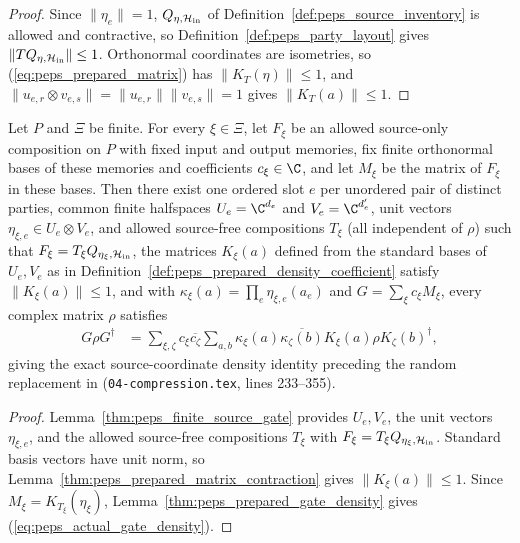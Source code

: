 \begin{proof}\leanok
    Since $\|\eta_e\|=1$, $Q_{\eta,\mathcal H_{\rm in}}$ of
    Definition~\ref{def:peps_source_inventory} is allowed and contractive, so
    Definition~\ref{def:peps_party_layout} gives
    $\|TQ_{\eta,\mathcal H_{\rm in}}\|\le1$. Orthonormal coordinates are
    isometries, so (\ref{eq:peps_prepared_matrix}) has $\|K_T(\eta)\|\le1$,
    and $\|u_{e,r}\otimes v_{e,s}\|=\|u_{e,r}\|\|v_{e,s}\|=1$ gives
    $\|K_T(a)\|\le1$.
\end{proof}

\begin{lemma}
    \label{thm:peps_actual_gate_density}
    \leanok
    Let $P$ and $\Xi$ be finite. For every $\xi\in\Xi$, let $F_\xi$ be an
    allowed source-only composition on $P$ with fixed input and output
    memories, fix finite orthonormal bases of these memories and coefficients
    $c_\xi\in\C$, and let $M_\xi$ be the matrix of $F_\xi$ in these bases.
    Then there exist one ordered slot $e$ per unordered pair of distinct
    parties, common finite halfspaces $U_e=\C^{d_e}$ and $V_e=\C^{d'_e}$, unit
    vectors $\eta_{\xi,e}\in U_e\otimes V_e$, and allowed source-free
    compositions $T_\xi$ (all independent of $\rho$) such that
    $F_\xi=T_\xi Q_{\eta_\xi,\mathcal H_{\rm in}}$, the matrices $K_\xi(a)$
    defined from the standard bases of $U_e,V_e$ as in
    Definition~\ref{def:peps_prepared_density_coefficient} satisfy
    $\|K_\xi(a)\|\le1$, and with $\kappa_\xi(a)=\prod_e\eta_{\xi,e}(a_e)$ and
    $G=\sum_\xi c_\xi M_\xi$, every complex matrix $\rho$ satisfies
    \begin{align}
        G\rho G^\dagger
         & =\sum_{\xi,\zeta}c_\xi\overline{c_\zeta}
        \sum_{a,b}\kappa_\xi(a)\overline{\kappa_\zeta(b)}
        K_\xi(a)\rho K_\zeta(b)^\dagger,
        \label{eq:peps_actual_gate_density}
    \end{align}
    giving the exact source-coordinate density identity preceding the random
    replacement in \cite[proof of Theorem~5.2]{OpenAI2026PolynomialPEPS}
    (\texttt{04-compression.tex}, lines 233--355).
\end{lemma}

\begin{proof}\leanok
    Lemma~\ref{thm:peps_finite_source_gate} provides $U_e,V_e$, the unit
    vectors $\eta_{\xi,e}$, and the allowed source-free compositions $T_\xi$
    with $F_\xi=T_\xi Q_{\eta_\xi,\mathcal H_{\rm in}}$. Standard basis vectors
    have unit norm, so Lemma~\ref{thm:peps_prepared_matrix_contraction} gives
    $\|K_\xi(a)\|\le1$. Since $M_\xi=K_{T_\xi}(\eta_\xi)$,
    Lemma~\ref{thm:peps_prepared_gate_density} gives
    (\ref{eq:peps_actual_gate_density}).
\end{proof}
